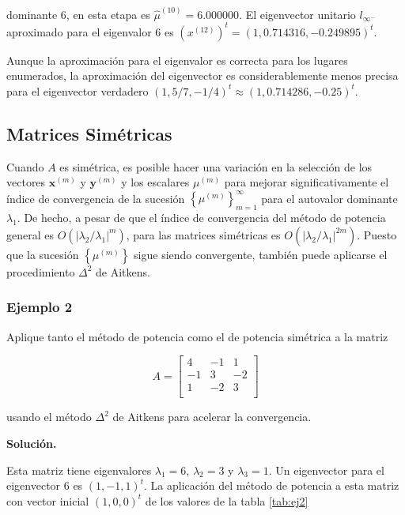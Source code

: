 \documentclass{report}
\numberwithin{subsection}{section} %
\begin{document}
    dominante 6, en esta etapa es $\hat{\mu}^{(10)} = 6.000000$. El eigenvector unitario $l_{\infty^-}$ aproximado para el eigenvalor 6 es $(x^{(12)})^t = (1, 0.714316,-0.249895)^t.$
    
    Aunque la aproximación para el eigenvalor es correcta para los lugares enumerados, la aproximación del eigenvector es considerablemente menos precisa para el eigenvector verdadero $(1, 5/7, -1/4)^t  \approx (1, 0.714286, -0.25)^t.$

\subsection{\textnormal{Matrices Simétricas}}

Cuando $A$ es simétrica, es posible hacer una variación en la selección de los vectores $\textbf{x}^{\left( m \right)}$ y $\textbf{y}^{\left( m \right)}$ y los escalares $\mu^{\left( m \right)}$ para mejorar significativamente el índice de convergencia de la sucesión $\left\{ \mu^{\left( m \right)} \right\}_{m=1}^{\infty}$ para el autovalor dominante $\lambda_{1}$. De hecho, a pesar de que el índice de convergencia del método de potencia general es $O\left( \left| \lambda_{2} / \lambda_{1} \right|^{m} \right)$, para las matrices simétricas es $O\left( \left| \lambda_{2} / \lambda_{1} \right|^{2m} \right)$. Puesto que la sucesión $\left\{ \mu^{\left( m \right)} \right\}$ sigue siendo convergente, también puede aplicarse el procedimiento $\Delta ^{2}$ de Aitkens.

\subsubsection*{Ejemplo 2}

Aplique tanto el método de potencia como el de potencia simétrica a la matriz

    $$A =\begin{bmatrix}
        4 & -1 & 1 \\
        -1 & 3 & -2 \\
        1 & -2 & 3 \\
    \end{bmatrix}$$

    usando el método $\Delta^2$ de Aitkens para acelerar la convergencia.

    {\bf Solución.}

    Esta matriz tiene eigenvalores $\lambda_1 = 6$, $\lambda_2 = 3$ y $\lambda_3 = 1$. Un eigenvector para el eigenvector 6 es $(1,-1, 1)^t$. La aplicación del método de potencia a esta matriz con vector inicial $(1, 0, 0)^t$ de los valores de la tabla \ref{tab:ej2}
\end{document}
